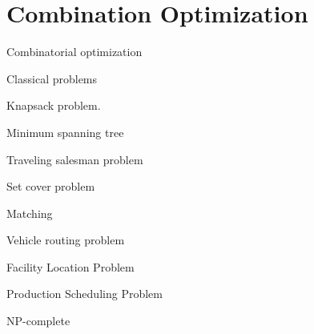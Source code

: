 \section{Combination Optimization}

    \frame{\sectionpage}

    \begin{frame}{Combinatorial optimization}

    \end{frame}

    \begin{frame}{Classical problems}
     \item Knapsack problem.
     \item Minimum spanning tree
     \item Traveling salesman problem
     \item Set cover problem
     \item Matching
     \item Vehicle routing problem
     \item Facility Location Problem
     \item Production Scheduling Problem
   \end{frame}

   \begin{frame}{NP-complete}

   \end{frame}

